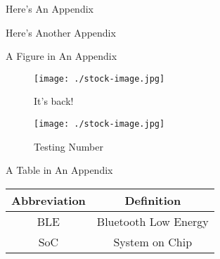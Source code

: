\documentclass{workreport}
\begin{document}
\begin{backmatter}

\begin{appendix}{Here's An Appendix}

	\lipsum[1-2]

\end{appendix}

\begin{appendix}{Here's Another Appendix}

	\lipsum[1-2]

\end{appendix}

\begin{appendix}{A Figure in An Appendix}

	\lipsum[1-2]

	\begin{figure}[!ht]
		\centering
		\texttt{[image: ./stock-image.jpg]}
		\caption{It's back!}
	\end{figure}

	\begin{figure}[!ht]
		\centering
		\texttt{[image: ./stock-image.jpg]}
		\caption{Testing Number}
	\end{figure}

\end{appendix}

\begin{appendix}{A Table in An Appendix}

        \lipsum[1-2]

        \begin{table}
		\centering

		\begin{tabular}{|c|c|} \hline
			\textbf{Abbreviation} & \textbf{Definition} \\ \hline
			BLE & Bluetooth Low Energy \\ \hline
			SoC & System on Chip \\ \hline
		\end{tabular}


\end{table}
\end{appendix}
\end{backmatter}
\end{document}
